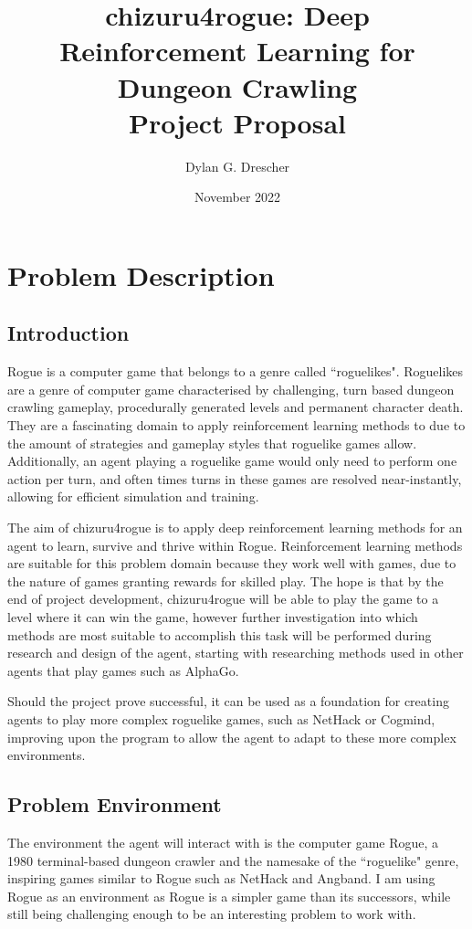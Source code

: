 \documentclass[11pt,a4paper]{article}
\begin{document}
\title{chizuru4rogue: Deep Reinforcement Learning for Dungeon Crawling \\[1ex] \large Project Proposal}
\author{Dylan G. Drescher}
\date{November 2022}
\maketitle

\section{Problem Description}
\subsection{Introduction}
Rogue is a computer game that belongs to a genre called ``roguelikes". Roguelikes are a genre of computer game characterised by challenging, turn based dungeon crawling gameplay, procedurally generated levels and permanent character death. They are a fascinating domain to apply reinforcement learning methods to due to the amount of strategies and gameplay styles that roguelike games allow. Additionally, an agent playing a roguelike game would only need to perform one action per turn, and often times turns in these games are resolved near-instantly, allowing for efficient simulation and training.

The aim of chizuru4rogue is to apply deep reinforcement learning methods for an agent to learn, survive and thrive within Rogue. Reinforcement learning methods are suitable for this problem domain because they work well with games, due to the nature of games granting rewards for skilled play. The hope is that by the end of project development, chizuru4rogue will be able to play the game to a level where it can win the game, however further investigation into which methods are most suitable to accomplish this task will be performed during research and design of the agent, starting with researching methods used in other agents that play games such as AlphaGo.

Should the project prove successful, it can be used as a foundation for creating agents to play more complex roguelike games, such as NetHack or Cogmind, improving upon the program to allow the agent to adapt to these more complex environments.

\subsection{Problem Environment}
The environment the agent will interact with is the computer game Rogue, a 1980 terminal-based dungeon crawler and the namesake of the ``roguelike" genre, inspiring games similar to Rogue such as NetHack and Angband.
I am using Rogue as an environment as Rogue is a simpler game than its successors, while still being challenging enough to be an interesting problem to work with.
\end{document}
